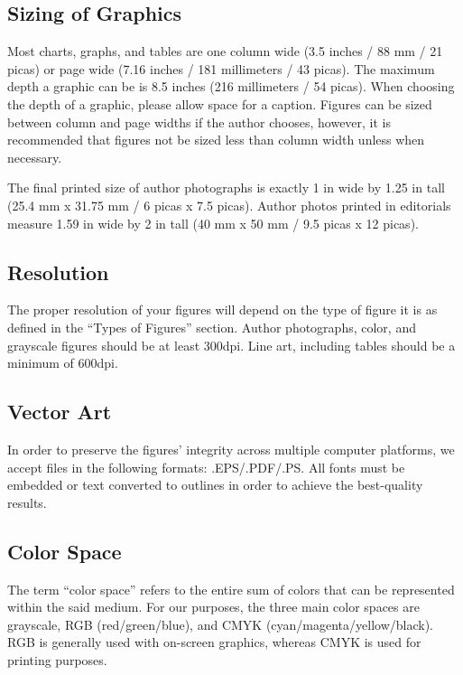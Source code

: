 \documentclass{IEEEtaes}
\begin{document}
\subsection{Sizing of Graphics}

Most charts, graphs, and tables are one column wide (3.5 inches / 88 mm / 21 picas) or page wide (7.16 inches / 181 millimeters / 43 picas). The maximum depth a graphic can be is 8.5 inches (216 millimeters / 54 picas). When choosing the depth of a graphic, please allow space for a caption. Figures can be sized between column and page widths if the author chooses, however, it is recommended that figures not be sized less than column width unless when necessary.

The final printed size of author photographs is exactly 1 in wide by 1.25 in tall (25.4 mm x 31.75 mm / 6 picas x 7.5 picas). Author photos printed in editorials measure 1.59 in wide by 2 in tall (40 mm x 50 mm / 9.5 picas x 12 picas).

\subsection{Resolution}

The proper resolution of your figures will depend on the type of figure it is as defined in the ``Types of Figures'' section. Author photographs, color, and grayscale figures should be at least 300dpi. Line art, including tables should be a minimum of 600dpi.

\subsection{Vector Art}

In order to preserve the figures' integrity across multiple computer platforms, we accept files in the following formats: .EPS/.PDF/.PS. All fonts must be embedded or text converted to outlines in order to achieve the best-quality results.

\subsection{Color Space}

The term ``color space'' refers to the entire sum of colors that can be represented within the said medium. For our purposes, the three main color spaces are grayscale, RGB (red/green/blue), and CMYK (cyan/magenta/yellow/black). RGB is generally used with on-screen graphics, whereas CMYK is used for printing purposes.
\end{document}
